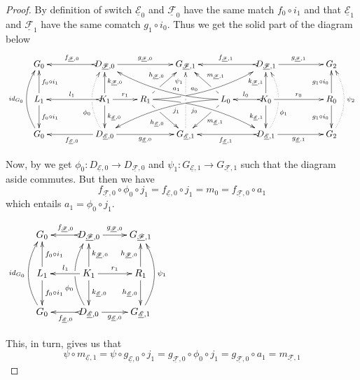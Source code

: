 \documentclass[a4paper,UKenglish,cleveref,pdftex,thm-restate,numberwithinsect]{lipics-v2021}
\newcommand{\id}[1]{\mathsf{id}_{#1}}
\newcommand{\dder}[1]{\mathscr{#1}}
\newcommand{\der}[1]{\underline{\dder{#1}}}
\begin{document}
\begin{proof}
    By definition of switch $\der{E}_0$ and $\der{F}_0$ have the same match $f_0\circ i_1$ and that $\der{E}_1$ and $\der{F}_1$ have the same comatch $g_1\circ i_0$. Thus we get the solid part of the diagram below
    \[\xymatrix@C=22pt{G_{0} && \ar@{>->}[ll]_{f_{\der{F},0}} D_{\der{F},0} \ar[rr]^{g_{\der{F},0}}&& G_{\der{F},1} && \ar@{>->}[ll]_{f_{\der{F},1}} D_{\der{F},1} \ar[rr]^{g_{\der{F},1}}&& G_{2}\\L_1 \ar[d]^{f_0\circ i_1} \ar[u]_{f_0\circ i_1}&& K_{1} \ar[d]^{k_{\der{E},0}} \ar[u]_{k_{\der{F},0}}\ar@{>->}[ll]_{l_1} \ar[r]^{r_1} & R_{1} \ar@/^.35cm/[drrr]|(.3)\hole_(.4){j_0} \ar[dr]|(.3)\hole_{h_{\der{E},0}} \ar@/_.35cm/[urrr]|(.3)\hole^(.4){a_0} \ar[ur]|(.3)\hole^{h_{\der{F},0}}& &L_{0} \ar@/_.35cm/[dlll]^(.4){j_1} \ar[dl]|(.3)\hole^{m_{\der{E},1}} \ar@/^.35cm/[ulll]_(.4){a_1} \ar[ul]|(.3)\hole_{m_{\der{F},1}}& K_{0} \ar[d]_{k_{\der{E},1}} \ar[u]^{k_{\der{F},1}}\ar@{>->}[l]_{l_{0}} \ar[rr]^{r_0} && R_{0} \ar[d]_{g_1\circ i_0} \ar[u]^{g_1\circ i_0}\\ \ar@/^.5cm/[uu]^{\id{G_0}} G_{0} && \ar[ll]^{f_{\der{E},0}} D_{\der{E},0} \ar@{.>}@/^.5cm/[uu]^(.33){\phi_{0}}|\hole \ar[rr]_{g_{\der{E},0}}&& G_{\der{E},1} \ar@{.>}[uu]^(.76){\psi_1}|(.45)\hole |(.55)\hole&& \ar@{>->}[ll]^{f_{\der{E},1}} D_{\der{E},1} \ar@{.>}@/_.5cm/[uu]_(.33){\phi_{1}}|\hole\ar[rr]_{g_{\der{E},1}}&& G_{2}\ar@{.>}@/_.5cm/[uu]_{\psi_2}}\]
    
    \parbox{7cm}{\hspace{15pt}Now, by  we get $\phi_0\colon D_{\der{E},0}\to D_{\der{F},0}$ and $\psi_1 \colon G_{\der{E},1}\to G_{\der{F},1}$ such that the diagram aside commutes. But then we have
    	\[
    	f_{\der{F},0}\circ \phi_0\circ j_1=f_{\der{E},0} \circ j_1=m_0=f_{\der{F},0}\circ a_1\]
    	which entails $a_1= \phi_0\circ j_1$.}
\parbox{4cm} {$\xymatrix{G_{0} & \ar@{>->}[l]_{f_{\der{F},0}} D_{\der{F},0} \ar[r]^{g_{\der{F},0}}& G_{\der{F},1} \\L_1 \ar[d]^{f_0\circ i_1} \ar[u]_{f_0\circ i_1}& K_{1} \ar[d]^{k_{\der{E},0}} \ar[u]_{k_{\der{F},0}}\ar[l]_{l_1} \ar[r]^{r_1} & R_{1}  \ar[d]_{h_{\der{E},0}}  \ar[u]^{h_{\der{F},0}}\\ \ar@/^.5cm/[uu]^{\id{G_0}} G_{0} & \ar@{>->}[l]^{f_{\der{E},0}} D_{\der{E},0} \ar@/^.5cm/[uu]^(.33){\phi_{0}}|\hole \ar[r]_{g_{\der{E},0}}& G_{\der{E},1} \ar@/_.5cm/[uu]_{\psi_1}}$}
    
     This, in turn, gives us that
    \[\psi\circ m_{\der{E},1}=\psi \circ g_{\der{E},0}\circ j_1=g_{\der{F},0}\circ \phi_0\circ j_1=g_{\der{F},0}\circ a_1=m_{\der{F},1}\]
    

\end{proof}
\end{document}
